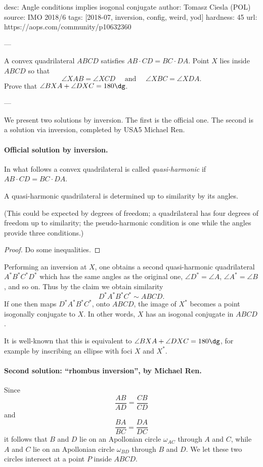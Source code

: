 desc: Angle conditions implies isogonal conjugate
author: Tomasz Ciesla (POL)
source: IMO 2018/6
tags: [2018-07, inversion, config, weird, yod]
hardness: 45
url: https://aops.com/community/p10632360

---

A convex quadrilateral $ABCD$ satisfies $AB \cdot CD = BC \cdot DA$.
Point $X$ lies inside $ABCD$ so that
\[ \angle XAB=\angle XCD \quad \text{ and } \quad \angle XBC=\angle XDA. \]
Prove that $\angle BXA + \angle DXC=180\dg$.

---

We present two solutions by inversion.
The first is the official one.
The second is a solution via inversion,
completed by USA5 Michael Ren.

\paragraph{Official solution by inversion.}
In what follows a convex quadrilateral is called
\emph{quasi-harmonic} if $AB \cdot CD = BC \cdot DA$.

\begin{claim*}
  A quasi-harmonic quadrilateral is determined
  up to similarity by its angles.
\end{claim*}
(This could be expected by degrees of freedom;
a quadrilateral has four degrees of freedom up to similarity;
the pseudo-harmonic condition is one
while the angles provide three conditions.)
\begin{proof}
  Do some inequalities.
\end{proof}

Performing an inversion at $X$, one obtains a
second quasi-harmonic quadrilateral
$A^\ast B^\ast C^\ast D^\ast$ which has the same angles
as the original one, $\angle D^\ast = \angle A$,
$\angle A^\ast = \angle B$, and so on.
Thus by the claim we obtain similarity
\[ D^\ast A^\ast B^\ast C^\ast \sim ABCD. \]
If one then maps $D^\ast A^\ast B^\ast C^\ast$,
onto $ABCD$, the image of $X^\ast$
becomes a point isogonally conjugate to $X$.
In other words, $X$ has an isogonal conjugate in $ABCD$.

It is well-known that this is equivalent to
$\angle BXA + \angle DXC = 180\dg$,
for example by inscribing an ellipse with foci $X$ and $X^\ast$.

\paragraph{Second solution: ``rhombus inversion'', by Michael Ren.}
Since
\[ \frac{AB}{AD} = \frac{CB}{CD} \]
and
\[ \frac{BA}{BC} = \frac{DA}{DC} \]
it follows that $B$ and $D$ lie on an Apollonian circle $\omega_{AC}$
through $A$ and $C$,
while $A$ and $C$ lie on an Apollonian circle $\omega_{BD}$
through $B$ and $D$.
We let these two circles intersect at a point $P$ inside $ABCD$.

